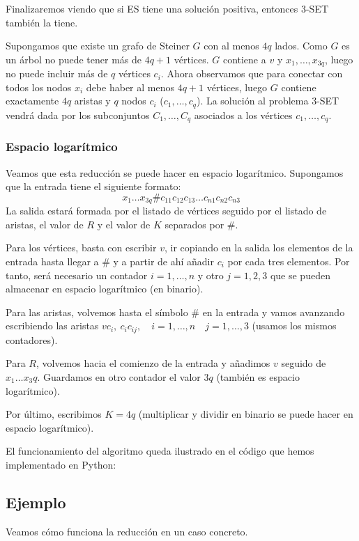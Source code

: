 \documentclass[a4paper, 11pt]{article}
\begin{document}
Finalizaremos viendo que si ES tiene una solución positiva, entonces 3-SET también la tiene.

Supongamos que existe un grafo de Steiner $G$ con al menos $4q$ lados. Como $G$ es un árbol no puede tener más de $4q+1$ vértices. $G$ contiene a $v$ y $x_1,\dots,x_{3q}$, luego no puede incluir más de $q$ vértices $c_i$. Ahora observamos que para conectar con todos los nodos $x_i$ debe haber al menos $4q+1$ vértices, luego $G$ contiene exactamente $4q$ aristas y $q$ nodos $c_i$ ($c_1,\dots,c_q$). La solución al problema 3-SET vendrá dada por los subconjuntos $C_1,\dots,C_q$ asociados a los vértices $c_1,\dots,c_q$.

\subsubsection*{Espacio logarítmico}

Veamos que esta reducción se puede hacer en espacio logarítmico. Supongamos que la entrada tiene el siguiente formato: $$x_1 \dots x_{3q} \# c_{11} c_{12} c_{13} \dots c_{n1} c_{n2} c_{n3}$$ La salida estará formada por el listado de vértices seguido por el listado de aristas, el valor de $R$ y el valor de $K$ separados por $\#$.

Para los vértices, basta con escribir $v$, ir copiando en la salida los elementos de la entrada hasta llegar a $\#$ y a partir de ahí añadir $c_i$ por cada tres elementos. Por tanto, será necesario un contador $i=1,\dots,n$ y otro $j=1,2,3$  que se pueden almacenar en espacio logarítmico (en binario).

Para las aristas, volvemos hasta el símbolo $\#$ en la entrada y vamos avanzando escribiendo las aristas $vc_{i},\ c_ic_{ij}, \quad i=1,\dots,n \quad j=1,\dots,3$ (usamos los mismos contadores).

Para $R$, volvemos hacia el comienzo de la entrada y añadimos $v$ seguido de $x_1 \dots x_3q$. Guardamos en otro contador el valor $3q$ (también es espacio logarítmico).

Por último, escribimos $K = 4q$ (multiplicar y dividir en binario se puede hacer en espacio logarítmico).

El funcionamiento del algoritmo queda ilustrado en el código que hemos implementado en Python:



\subsection*{Ejemplo}
Veamos cómo funciona la reducción en un caso concreto.
\end{document}

